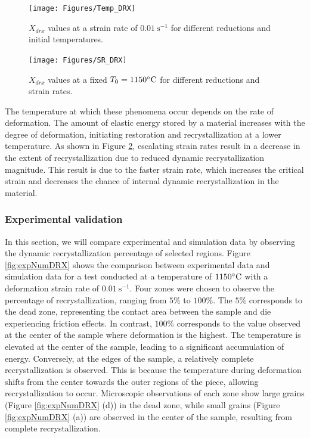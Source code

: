 \documentclass[metals,article,submit,pdftex,moreauthors]{Definitions/mdpi}
\DeclareRobustCommand{\ps}{\text{s}^{-1}}
\begin{document}
\begin{figure}[H]
\centering
\texttt{[image: Figures/Temp\_DRX]}
\caption{$X_{drx}$ values at a strain rate of $0.01~\ps$ for different reductions and initial temperatures.}
\label{fig:TempEffect}
\end{figure}
\begin{figure}[H]
\centering
\texttt{[image: Figures/SR\_DRX]}
\caption{$X_{drx}$ values at a fixed $T_0=1150\celsius$ for different reductions and strain rates.}
\label{fig:SREffect}
\end{figure}

The temperature at which these phenomena occur depends on the rate of deformation.
The amount of elastic energy stored by a material increases with the degree of deformation, initiating restoration and recrystallization at a lower temperature.
As shown in Figure \ref{fig:SREffect}, escalating strain rates result in a decrease in the extent of recrystallization due to reduced dynamic recrystallization magnitude.
This result is due to the faster strain rate, which increases the critical strain and decreases the chance of internal dynamic recrystallization in the material.

\subsubsection{Experimental validation \label{subsec:ExpValid}}

In this section, we will compare experimental and simulation data by observing the dynamic recrystallization percentage of selected regions.
Figure \ref{fig:expNumDRX} shows the comparison between experimental data and simulation data for a test conducted at a temperature of $1150\celsius$ with a deformation strain rate of $0.01~\ps$.
Four zones were chosen to observe the percentage of recrystallization, ranging from $5\%$ to $100\%$.
The $5\%$ corresponds to the dead zone, representing the contact area between the sample and die experiencing friction effects.
In contrast, $100\%$ corresponds to the value observed at the center of the sample where deformation is the highest.
The temperature is elevated at the center of the sample, leading to a significant accumulation of energy.
Conversely, at the edges of the sample, a relatively complete recrystallization is observed.
This is because the temperature during deformation shifts from the center towards the outer regions of the piece, allowing recrystallization to occur.
Microscopic observations of each zone show large grains (Figure \ref{fig:expNumDRX} (d)) in the dead zone, while small grains (Figure \ref{fig:expNumDRX} (a)) are observed in the center of the sample, resulting from complete recrystallization.
\end{document}
